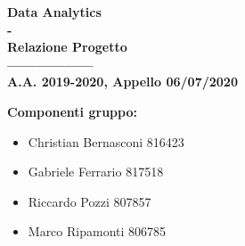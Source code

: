 \begin{center}
    {\Huge \textbf{Data Analytics}}\\
    {\Huge \textbf{-}}\\
    {\Huge \textbf{Relazione Progetto}}\\
    {\Huge \textbf{------------------}}\\
    {\textbf{A.A. 2019-2020, Appello 06/07/2020}}\\
\end{center}

\vspace{4cm}

\large\textbf{Componenti gruppo:}\\
\begin{itemize}
    \item Christian Bernasconi 816423\\
    \item Gabriele Ferrario 817518\\
    \item Riccardo Pozzi 807857\\
    \item Marco Ripamonti 806785    
\end{itemize}